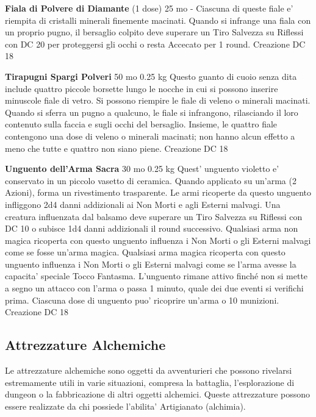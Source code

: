 \documentclass[a4paper,11pt,twoside,openany]{dndbook}
\begin{document}
{\textbf{Fiala di Polvere di Diamante} (1 dose) 25 mo - Ciascuna di queste fiale e' riempita di cristalli minerali finemente macinati. Quando si infrange una fiala con un proprio pugno, il bersaglio colpito deve superare un Tiro Salvezza su Riflessi con DC 20 per proteggersi gli occhi o resta Accecato per 1 round. Creazione DC 18

\textbf{Tirapugni Spargi Polveri} 50 mo 0.25 kg Questo guanto di cuoio senza dita include quattro piccole borsette lungo le nocche in cui si possono inserire minuscole fiale di vetro. Si possono riempire le fiale di veleno o minerali macinati. Quando si sferra un pugno a qualcuno, le fiale si infrangono, rilasciando il loro contenuto sulla faccia e sugli occhi del bersaglio. Insieme, le quattro fiale contengono una dose di veleno o minerali macinati; non hanno alcun effetto a meno che tutte e quattro non siano piene. Creazione DC 18

\textbf{Unguento dell'Arma Sacra} 30 mo 0.25 kg Quest' unguento violetto e' conservato in un piccolo vasetto di ceramica. Quando applicato su un'arma (2 Azioni), forma un rivestimento trasparente. Le armi ricoperte da questo unguento infliggono 2d4 danni addizionali ai Non Morti e agli Esterni malvagi. Una creatura influenzata dal balsamo deve superare un Tiro Salvezza su Riflessi con DC 10 o subisce 1d4 danni addizionali il round successivo. Qualsiasi arma non magica ricoperta con questo unguento influenza i Non Morti o gli Esterni malvagi come se fosse un'arma magica. Qualsiasi arma magica ricoperta con questo unguento influenza i Non Morti o gli Esterni malvagi come se l'arma avesse la capacita' speciale Tocco Fantasma. L'unguento rimane attivo finché non si mette a segno un attacco con l'arma o passa 1 minuto, quale dei due eventi si verifichi prima. Ciascuna dose di unguento puo' ricoprire un'arma o 10 munizioni. Creazione DC 18

\subsection{Attrezzature Alchemiche}

\label{attrezzature-alchemiche}

Le attrezzature alchemiche sono oggetti da avventurieri che possono rivelarsi estremamente utili in varie situazioni, compresa la battaglia, l'esplorazione di dungeon o la fabbricazione di altri oggetti alchemici. Queste attrezzature possono essere realizzate da chi possiede l'abilita' Artigianato (alchimia).

}
\end{document}
